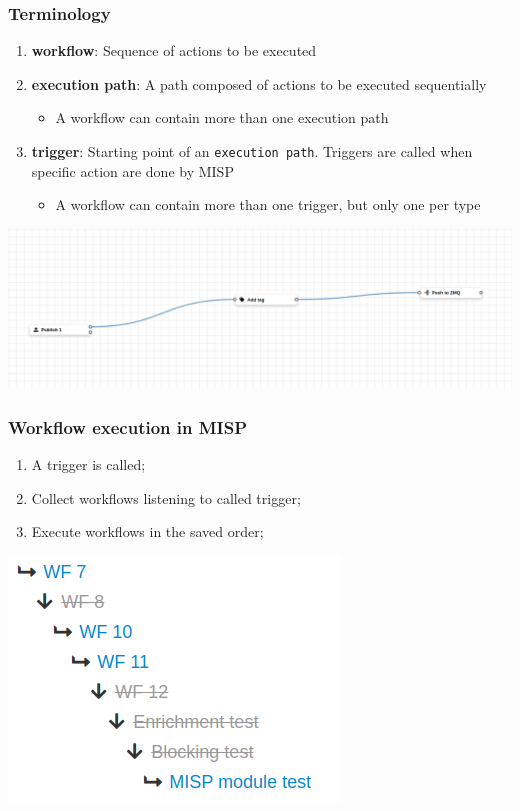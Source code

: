 \begin{frame}
    \frametitle{Terminology}
    \begin{enumerate}
        \item \textbf{workflow}: Sequence of actions to be executed
        \item \textbf{execution path}: A path composed of actions to be executed sequentially
        \begin{itemize}
            \item A workflow can contain more than one execution path
        \end{itemize}
        \item \textbf{trigger}: Starting point of an \texttt{execution path}. Triggers are called when specific action are done by MISP
        \begin{itemize}
            \item A workflow can contain more than one trigger, but only one per type
        \end{itemize}
    \end{enumerate}
    \begin{center}
        \includegraphics[width=1.0\linewidth]{pictures/workflow-view.png}
    \end{center}
\end{frame}


\begin{frame}
    \frametitle{Workflow execution in MISP}
    \begin{enumerate}
        \item A trigger is called;
        \item Collect workflows listening to called trigger;
        \item Execute workflows in the saved order;
    \end{enumerate}
    \begin{center}
        \includegraphics[width=0.5\linewidth]{pictures/execution-order-1.png}
    \end{center}
\end{frame}

